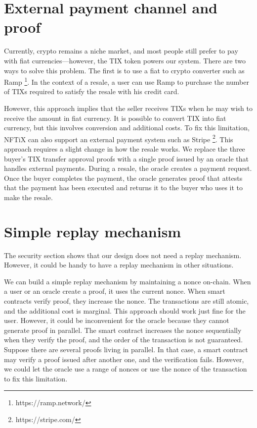 \documentclass[a4paper,11pt,oneside]{report}
\begin{document}
\section{External payment channel and proof}
Currently, crypto remains a niche market, and most people still prefer to pay with fiat currencies—however, the TIX token powers our system. There are two ways to solve this problem. The first is to use a fiat to crypto converter such as Ramp \footnote{https://ramp.network/}. In the context of a resale, a user can use Ramp to purchase the number of TIXs required to satisfy the resale with his credit card. 

However, this approach implies that the seller receives TIXs when he may wish to receive the amount in fiat currency. It is possible to convert TIX into fiat currency, but this involves conversion and additional costs. To fix this limitation, NFTiX can also support an external payment system such as Stripe \footnote{https://stripe.com/}. This approach requires a slight change in how the resale works. We replace the three buyer's TIX transfer approval proofs with a single proof issued by an oracle that handles external payments. During a resale, the oracle creates a payment request. Once the buyer completes the payment, the oracle generates proof that attests that the payment has been executed and returns it to the buyer who uses it to make the resale.

\section{Simple replay mechanism}
The security section shows that our design does not need a replay mechanism. However, it could be handy to have a replay mechanism in other situations. 

We can build a simple replay mechanism by maintaining a nonce on-chain. When a user or an oracle create a proof, it uses the current nonce. When smart contracts verify proof, they increase the nonce. The transactions are still atomic, and the additional cost is marginal. This approach should work just fine for the user. However, it could be inconvenient for the oracle because they cannot generate proof in parallel. The smart contract increases the nonce sequentially when they verify the proof, and the order of the transaction is not guaranteed. Suppose there are several proofs living in parallel. In that case, a smart contract may verify a proof issued after another one, and the verification fails. However, we could let the oracle use a range of nonces or use the nonce of the transaction to fix this limitation.
\end{document}
